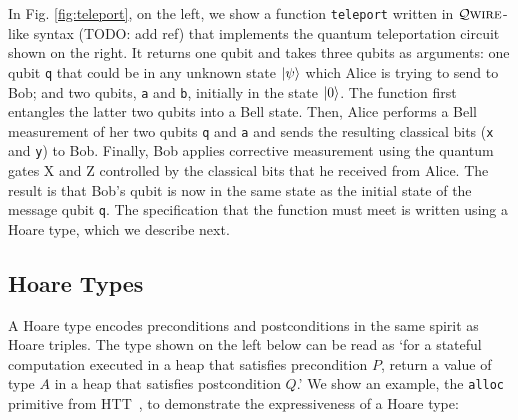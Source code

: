 \documentclass[acmsmall,nonacm,timestamp]{acmart}
\newcommand{\qwire}{\ensuremath{\mathcal{Q}\textsc{wire}}\xspace}
\begin{document}
In Fig. \ref{fig:teleport}, on the left, we show a function \lstinline{teleport} written in \qwire-like syntax (TODO: add ref) that implements the quantum teleportation circuit shown on the right. It returns one qubit and takes three qubits as arguments: one qubit \lstinline{q} that could be in any unknown state $\ket{\psi}$ which Alice is trying to send to Bob; and two qubits, \lstinline{a} and \lstinline{b}, initially in the state $\ket{0}$. The function first entangles the latter two qubits into a Bell state. Then, Alice performs a Bell measurement of her two qubits \lstinline{q} and \lstinline{a} and sends the resulting classical bits (\lstinline{x} and \lstinline{y}) to Bob. Finally, Bob applies corrective measurement using the quantum gates X and Z controlled by the classical bits that he received from Alice. The result is that Bob's qubit is now in the same state as the initial state of the message qubit \lstinline{q}. The specification that the function must meet is written using a Hoare type, which we describe next.

\subsection{Hoare Types}
A Hoare type encodes preconditions and postconditions in the same spirit as Hoare triples. The type shown on the left below can be read as `for a stateful computation executed in a heap that satisfies precondition $P$, return a value of type $A$ in a heap that satisfies postcondition $Q$.' We show an example, the \lstinline{alloc} primitive from HTT~\cite{nanevski_hoare_2008}, to demonstrate the expressiveness of a Hoare type:
\end{document}
